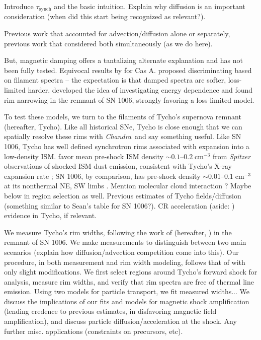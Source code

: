 \documentclass[iop, apj, numberedappendix, twocolappendix]{emulateapj}
\newcommand*{\mt}{\mathrm}
\newcommand*{\unit}[1]{\;\mt{#1}}  %
\newcommand*{\abt}{\mathord{\sim}} %
\newcommand*{\Chandra}{\textit{Chandra}\ }
\newcommand*{\tsynch}{\tau_{\mt{synch}}}
\begin{document}
Introduce $\tsynch$ and the basic intuition.
Explain why diffusion is an important consideration
(when did this start being recognized as relevant?).

Previous work that accounted for advection/diffusion alone or separately,
previous work that considered both simultaneously (as we do here).

But, magnetic damping offers a tantalizing alternate explanation and has not
been fully tested.  Equivocal results by \citet{araya2010} for Cas A.
\citet{rettig2012} proposed discriminating based on filament spectra -- the
expectation is that damped spectra are softer, loss-limited harder.
\citet{ressler2014} developed the idea of investigating energy dependence and
found rim narrowing in the remnant of SN 1006, strongly favoring a loss-limited
model.

To test these models, we turn to the filaments of Tycho's supernova remnant
(hereafter, Tycho).
Like all historical SNe, Tycho is close enough that we can spatially
resolve these rims with \Chandra and say something useful.  Like SN 1006, Tycho
has well defined synchrotron rims associated with expansion into a low-density
ISM.  \citet{williams2013} favor mean pre-shock ISM density $\abt 0.1$--$0.2
\unit{cm^{-3}}$ from \textit{Spitzer} observations of shocked ISM dust
emission, consistent with Tycho's X-ray expansion rate \citep{katsuda2010}; SN
1006, by comparison, has pre-shock density $\abt 0.01$--$0.1 \unit{cm^{-3}}$ at
its nonthermal NE, SW limbs \citep{acero2007}.
Mention molecular cloud interaction \citep{reynoso1999}? Maybe below in region
selection as well.
Previous estimates of Tycho fields/diffusion (something similar to Sean's table
for SN 1006?).  CR acceleration (aside: \citet{eriksen2011}) evidence in Tycho,
if relevant.

We measure Tycho's rim widths, following the work of \citet{ressler2014}
(hereafter, ) in the remnant of SN 1006.
We make measurements to distinguish between two main scenarios
(explain how diffusion/advection competition come into this).
Our procedure, in both measurement and rim width modeling, follows that of
 with only slight modifications.
We first select regions around Tycho's forward shock for analysis, measure
rim widths, and verify that rim spectra are free of thermal line emission.
Using two models for particle transport, we fit measured widths...
We discuss the implications of our fits and models for magnetic shock
amplification (lending credence to previous estimates, in disfavoring magnetic
field amplification), and discuss particle diffusion/acceleration at the shock.
Any further misc. applications (constraints on precursors, etc).
\end{document}
